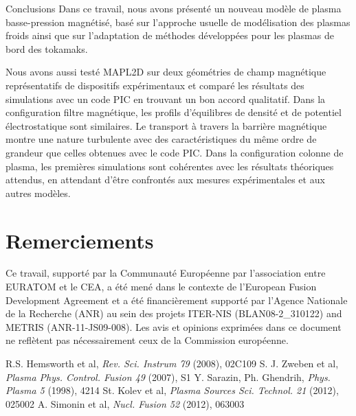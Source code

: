 \documentclass[a4paper,11pt]{article} %
\begin{document}
\begin{section}{Conclusions} 
Dans ce travail, nous avons présenté un nouveau modèle de plasma basse-pression magnétisé, basé sur l'approche 
usuelle de modélisation des plasmas froids ainsi que sur l'adaptation de méthodes développées pour les plasmas de 
bord des tokamaks. 

Nous avons aussi testé MAPL2D sur deux géométries de champ magnétique représentatifs de dispositifs expérimentaux 
et comparé les résultats des simulations avec un code PIC en trouvant un bon accord qualitatif. Dans la configuration 
filtre magnétique, les profils d'équilibres de densité et de potentiel électrostatique sont similaires. Le transport
à travers la barrière magnétique montre une nature turbulente avec des caractéristiques du même ordre de grandeur que
celles obtenues avec le code PIC. Dans la configuration colonne de plasma, les premières simulations sont cohérentes avec
les résultats théoriques attendus, en attendant d'être confrontés aux mesures expérimentales et aux autres modèles.
\end{section}

\section*{Remerciements}
Ce travail, supporté par la Communauté Européenne par l'association entre EURATOM et le CEA, a été mené dans le contexte de 
l'European Fusion Development Agreement et a été financièrement supporté par l'Agence Nationale de la Recherche (ANR) au sein
des projets ITER-NIS (BLAN08-2\_310122) and METRIS (ANR-11-JS09-008). Les avis et opinions exprimées dans ce document ne 
reflètent pas nécessairement ceux de la Commission européenne.

\begin{thebibliography}{1}

 R.S. Hemsworth et al, {\em Rev. Sci. Instrum 79} (2008), 02C109
 S. J. Zweben et al, {\em Plasma Phys. Control. Fusion 49} (2007), S1
 Y. Sarazin, Ph. Ghendrih, {\em Phys. Plasma 5} (1998), 4214
 St. Kolev et al, {\em Plasma Sources Sci. Technol. 21} (2012), 025002
 A. Simonin et al, {\em Nucl. Fusion 52} (2012), 063003

\end{thebibliography}
\end{document}
